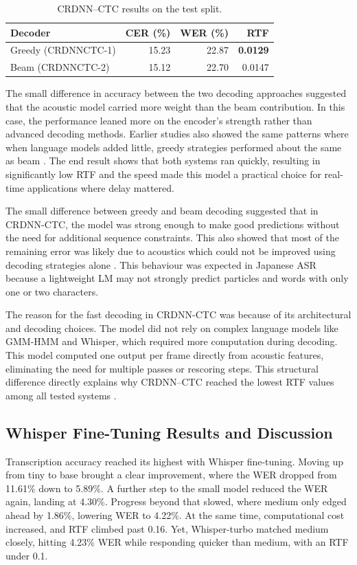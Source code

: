\begin{table}[H]
\centering
\caption{CRDNN--CTC results on the test split.}
\label{tab:crdnn_results}
{\small
\setlength{\tabcolsep}{6pt}
\renewcommand{\arraystretch}{1.2}
\begin{tabular}{lrrr}
\hline
\textbf{Decoder} & \textbf{CER (\%)} & \textbf{WER (\%)} & \textbf{RTF} \\
\hline
Greedy (CRDNNCTC-1) & 15.23 & 22.87 & \textbf{0.0129} \\
Beam (CRDNNCTC-2)   & 15.12 & 22.70 & 0.0147 \\
\hline
\end{tabular}}
\end{table}

The small difference in accuracy between the two decoding approaches suggested that the acoustic model carried more weight than the beam contribution. In this case, the performance leaned more on the encoder’s strength rather than advanced decoding methods. Earlier studies also showed the same patterns where when language models added little, greedy strategies performed about the same as beam \parencite{chen2020streaming}. The end result shows that both systems ran quickly, resulting in significantly low RTF and the speed made this model a practical choice for real-time applications where delay mattered.

The small difference between greedy and beam decoding suggested that in CRDNN-CTC, the model was strong enough to make good predictions without the need for additional sequence constraints. This also showed that most of the remaining error was likely due to acoustics which could not be improved using decoding strategies alone \parencite{watanabe2018espnetendtoendspeechprocessing}. This behaviour was expected in Japanese ASR because a lightweight LM may not strongly predict particles and words with only one or two characters.

The reason for the fast decoding in CRDNN-CTC was because of its architectural and decoding choices. The model did not rely on complex language models like GMM-HMM and Whisper, which required more computation during decoding. This model computed one output per frame directly from acoustic features, eliminating the need for multiple passes or rescoring steps. This structural difference directly explains why CRDNN--CTC reached the lowest RTF values among all tested systems \parencite{watanabe2018espnetendtoendspeechprocessing}.


\subsection{Whisper Fine-Tuning Results and Discussion}
\label{sec:whisper_results}
Transcription accuracy reached its highest with Whisper fine-tuning. Moving up from tiny to base brought a clear improvement, where the WER dropped from 11.61\% down to 5.89\%. A further step to the small model reduced the WER again, landing at 4.30\%. Progress beyond that slowed, where medium only edged ahead by 1.86\%, lowering WER to 4.22\%. At the same time, computational cost increased, and RTF climbed past 0.16. Yet, Whisper-turbo matched medium closely, hitting 4.23\% WER while responding quicker than medium, with an RTF under 0.1.


